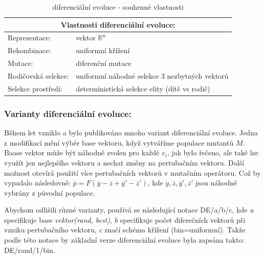 \begin{table}[h]\centering
\begin{tabular}{ l l }
    \multicolumn{2}{c}{Vlastnosti diferenciální evoluce:} \\
    \hline \hline
    Reprezentace: & vektor $\mathbb{R}^n$ \\
    \hline  
    Rekombinace: & uniformní křížení \\
    \hline  
    Mutace: & diferenční mutace \\
    \hline   
    Rodičovská selekce: & uniformní náhodné selekce 3 nezbytných vektorů \\
    \hline   
    Selekce prostředí: & deterministická selekce elity (dítě vs rodič) \\
  \end{tabular}
\caption{diferenciální evoluce - souhrnné vlastnosti}
\end{table} 
\par
\subsubsection{Varianty diferenciální evoluce:}
Během let vzniklo a bylo publikováno mnoho variant diferenciální evoluce. Jedna z modifikací mění výběr base vektoru, když vytváříme populace mutantů $M$. Baase vektor může být náhodně zvolen pro každé $v_i$, jak bylo řečeno, ale také lze využít jen nejlepšího vektoru a nechat změny na pertubačním vektoru. Další možnost otevírá použití více pertubačních vektorů v mutačním operátoru. Což by vypadalo následovně: 
$\overline{p} = F (\overline{y}-\overline{z} + \overline{y}' - \overline{z}')$, kde $\overline{y}, \overline{z}, \overline{y}',\overline{z}'$ jsou náhodně vybrány z původní populace.\par
Abychom odlišili různé varianty, používá se následující notace DE/a/b/c, kde \textit{a} specifikuje base \textit{vektor(rand, best)}, \textit{b} specifikuje počet diferečních  vektorů při vzniku pertubačního vektoru, \textit{c} značí schéma křížení (bin=uniformní). Takže podle této notace by základní verze diferenciální evoluce byla zapsána takto: DE/rand/1/bin. 
